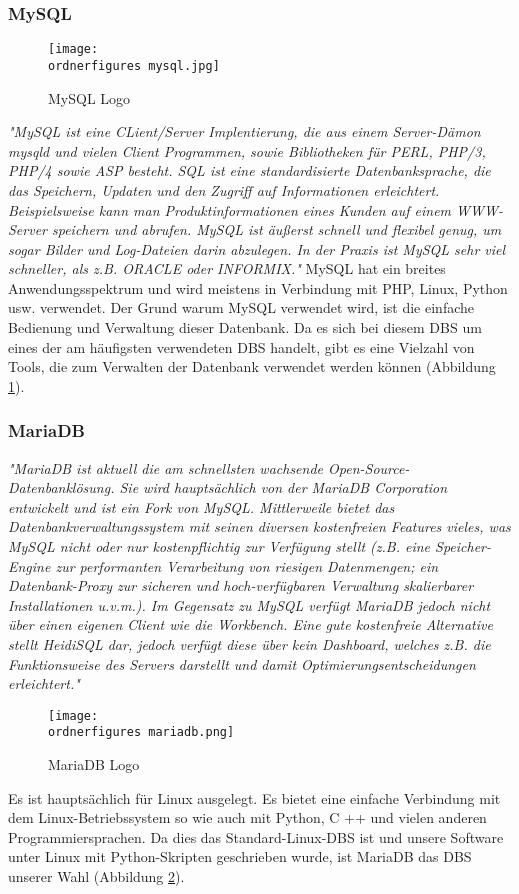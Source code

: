 \subsubsection{MySQL}
\begin{figure}
	\centering
	\texttt{[image: \\ordnerfigures mysql.jpg]}
	\caption{ MySQL Logo \cite{MySQLlogo}}
	\label{fig:mysql}
\end{figure}
\textit{"MySQL ist eine CLient/Server
Implentierung, die aus einem Server-Dämon mysqld und vielen Client Programmen, sowie
Bibliotheken für PERL, PHP/3, PHP/4 sowie ASP besteht.
SQL ist eine standardisierte Datenbanksprache, die das Speichern, Updaten und den Zugriff auf
Informationen erleichtert. Beispielsweise kann man Produktinformationen eines Kunden auf einem
WWW-Server speichern und abrufen. MySQL ist äußerst schnell und flexibel genug, um sogar Bilder
und Log-Dateien darin abzulegen. In der Praxis ist MySQL sehr viel schneller, als z.B. ORACLE oder INFORMIX."}\cite{stepken1999mysql}
\bigbreak
MySQL hat ein breites Anwendungsspektrum und wird meistens in Verbindung mit PHP, Linux, Python usw. verwendet. Der Grund warum MySQL verwendet wird, ist die einfache Bedienung und Verwaltung dieser Datenbank. Da es sich bei diesem DBS um eines der am häufigsten verwendeten DBS handelt, gibt es eine Vielzahl von Tools, die zum Verwalten der Datenbank verwendet werden können (Abbildung \ref{fig:mysql}).

\subsubsection{MariaDB}
\textit{"MariaDB ist aktuell die am schnellsten wachsende Open-Source-Datenbanklösung. Sie wird hauptsächlich von der MariaDB Corporation entwickelt und ist ein Fork von MySQL. Mittlerweile bietet das Datenbankverwaltungssystem mit seinen diversen kostenfreien Features vieles, was MySQL nicht oder nur kostenpflichtig zur Verfügung stellt (z.B. eine Speicher-Engine zur performanten Verarbeitung von riesigen Datenmengen; ein Datenbank-Proxy zur sicheren und hoch-verfügbaren Verwaltung skalierbarer Installationen u.v.m.). Im Gegensatz zu MySQL verfügt MariaDB jedoch nicht über einen eigenen Client wie die Workbench. Eine gute kostenfreie Alternative stellt HeidiSQL dar, jedoch verfügt diese über kein Dashboard, welches z.B. die Funktionsweise des Servers darstellt und damit Optimierungsentscheidungen erleichtert."}\cite{MariaDB-Monitor}
\begin{figure}[h]
	\centering
	\texttt{[image: \\ordnerfigures mariadb.png]}
	\caption{ MariaDB Logo \cite{MariaDBlogo}}
	\label{fig:mariadb}
\end{figure}
\bigbreak
Es ist hauptsächlich für Linux ausgelegt. Es bietet eine einfache Verbindung mit dem Linux-Betriebssystem so wie auch mit Python, C ++ und vielen anderen Programmiersprachen. Da dies das Standard-Linux-DBS ist und unsere Software unter Linux mit Python-Skripten geschrieben wurde, ist MariaDB das DBS unserer Wahl (Abbildung \ref{fig:mariadb}).

